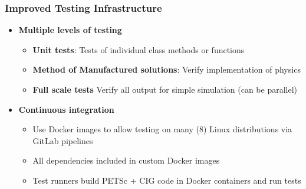 \documentclass[aspectratio=169]{beamer}
\newcommand{\highlight}[1]{{\bf\color{green}#1}}
\begin{document}
\begin{frame}
  \frametitle{Improved Testing Infrastructure}
  \summary{}

  \begin{itemize}
  \item \highlight{Multiple levels of testing}
    \begin{itemize}
    \item {\bf Unit tests}: Tests of individual class methods or functions
    \item {\bf Method of Manufactured solutions}: Verify implementation of physics
    \item {\bf Full scale tests} Verify all output for simple simulation (can be parallel)
    \end{itemize}
  \item \highlight{Continuous integration}
    \begin{itemize}
    \item Use Docker images to allow testing on many (8) Linux
      distributions via GitLab pipelines
    \item All dependencies included in custom Docker images
    \item Test runners build PETSc + CIG code in Docker containers and run tests
    \end{itemize}
  \end{itemize}
    
\end{frame}
\end{document}
